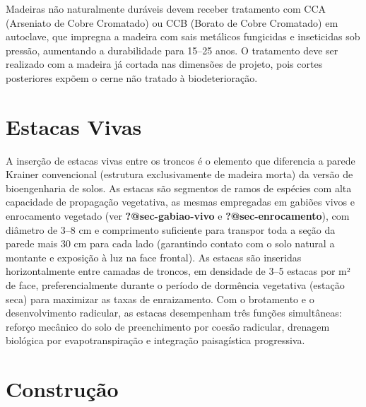 \documentclass[
  portuguese,
  11pt,
  a4paper,
  open=any]{scrbook}
\begin{document}
\begin{tcolorbox}[enhanced jigsaw, leftrule=.75mm, colframe=quarto-callout-tip-color-frame, colback=white, bottomrule=.15mm, opacityback=0, colbacktitle=quarto-callout-tip-color!10!white, breakable, bottomtitle=1mm, opacitybacktitle=0.6, title=\textcolor{quarto-callout-tip-color}{\faLightbulb}\hspace{0.5em}{Tratamento preservativo}, titlerule=0mm, toprule=.15mm, toptitle=1mm, rightrule=.15mm, left=2mm, arc=.35mm, coltitle=black]

Madeiras não naturalmente duráveis devem receber tratamento com CCA
(Arseniato de Cobre Cromatado) ou CCB (Borato de Cobre Cromatado) em
autoclave, que impregna a madeira com sais metálicos fungicidas e
inseticidas sob pressão, aumentando a durabilidade para 15--25 anos. O
tratamento deve ser realizado com a madeira já cortada nas dimensões de
projeto, pois cortes posteriores expõem o cerne não tratado à
biodeterioração.

\end{tcolorbox}

\section{Estacas Vivas}\label{estacas-vivas-1}

A inserção de estacas vivas entre os troncos é o elemento que diferencia
a parede Krainer convencional (estrutura exclusivamente de madeira
morta) da versão de bioengenharia de solos. As estacas são segmentos de
ramos de espécies com alta capacidade de propagação vegetativa, as
mesmas empregadas em gabiões vivos e enrocamento vegetado (ver
\textbf{?@sec-gabiao-vivo} e \textbf{?@sec-enrocamento}), com diâmetro
de 3--8 cm e comprimento suficiente para transpor toda a seção da parede
mais 30 cm para cada lado (garantindo contato com o solo natural a
montante e exposição à luz na face frontal). As estacas são inseridas
horizontalmente entre camadas de troncos, em densidade de 3--5 estacas
por m² de face, preferencialmente durante o período de dormência
vegetativa (estação seca) para maximizar as taxas de enraizamento. Com o
brotamento e o desenvolvimento radicular, as estacas desempenham três
funções simultâneas: reforço mecânico do solo de preenchimento por
coesão radicular, drenagem biológica por evapotranspiração e integração
paisagística progressiva.

\section{Construção}\label{construuxe7uxe3o-2}
\end{document}
